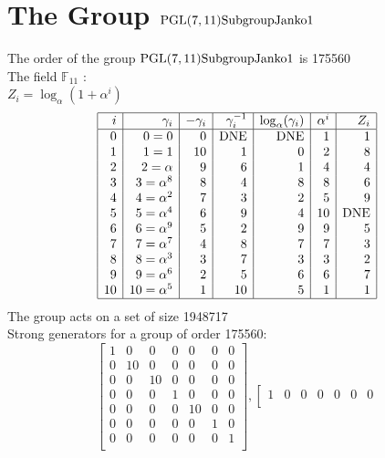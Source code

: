 

\section{The Group ${\rm PGL}(7,11){\rm Subgroup Janko1}$}
\label{app:J1}

\noindent The order of the group ${\rm PGL}(7,11){\rm Subgroup Janko1}$ is 175560\\
\noindent The field ${\mathbb F}_{11}$ :\\
{\small
$Z_i = \log_\alpha (1 + \alpha^i)$\\
$$\begin{array}{|*{7}{r|}}
\hline
i & \gamma_i & -\gamma_i& \gamma_i^{-1}& \log_\alpha(\gamma_i)& \alpha^i& Z_i\\
\hline
  0 & 0 = 0 &0 & \mbox{DNE} & \mbox{DNE} &1 &1\\
  1 &   1 = 1 &10 &1 &0 &2 &8\\
  2 &   2 = \alpha  &9 &6 &1 &4 &4\\
  3 &   3 = \alpha^{8} &8 &4 &8 &8 &6\\
  4 &   4 = \alpha^{2} &7 &3 &2 &5 &9\\
  5 &   5 = \alpha^{4} &6 &9 &4 &10 & \mbox{DNE}\\
  6 &   6 = \alpha^{9} &5 &2 &9 &9 &5\\
  7 &   7 = \alpha^{7} &4 &8 &7 &7 &3\\
  8 &   8 = \alpha^{3} &3 &7 &3 &3 &2\\
  9 &   9 = \alpha^{6} &2 &5 &6 &6 &7\\
 10 &  10 = \alpha^{5} &1 &10 &5 &1 &1\\
\hline
\end{array}
$$
\noindent The group acts on a set of size 1948717\\
Strong generators for a group of order 175560:
$$
\left[
\begin{array}{*{7}{r}}
1 & 0 & 0 & 0 & 0 & 0 & 0\\
0 & 10 & 0 & 0 & 0 & 0 & 0\\
0 & 0 & 10 & 0 & 0 & 0 & 0\\
0 & 0 & 0 & 1 & 0 & 0 & 0\\
0 & 0 & 0 & 0 & 10 & 0 & 0\\
0 & 0 & 0 & 0 & 0 & 1 & 0\\
0 & 0 & 0 & 0 & 0 & 0 & 1\\
\end{array}
\right]
, 
\left[
\begin{array}{*{7}{r}}
1 & 0 & 0 & 0 & 0 & 0 & 0\\

\end{array}$$}
